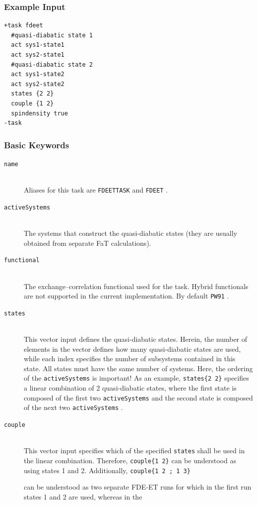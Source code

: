 \documentclass[bibliography=totocnumbered,a4paper,10pt,oneside]{scrbook}
\newcommand{\ttt}[1]{%
  \begingroup\setlength{\fboxsep}{1pt}%
  \colorbox{serenity-green!30}{\texttt{\hspace*{2pt}\vphantom{(g}#1\hspace*{2pt}}}%
  \endgroup
}
\begin{document}
\subsubsection{Example Input}
\begin{lstlisting}
+task fdeet
  #quasi-diabatic state 1
  act sys1-state1
  act sys2-state1
  #quasi-diabatic state 2
  act sys1-state2
  act sys2-state2
  states {2 2}
  couple {1 2}
  spindensity true
-task
\end{lstlisting}

\subsubsection{Basic Keywords}
\begin{description}
  \item [\texttt{name}]\hfill \\
  Aliases for this task are \ttt{FDEETTASK} and \ttt{FDEET}.
  \item [\texttt{activeSystems}]\hfill \\
  The systems that construct the quasi-diabatic states (they are usually obtained from separate FaT calculations).
  \item [\texttt{functional}]\hfill \\
  The exchange--correlation functional used for the task. Hybrid functionals are not supported in the current implementation.
  By default \ttt{PW91}.
  \item [\texttt{states}]\hfill \\
  This vector input defines the quasi-diabatic states. Herein, the number of elements in the vector defines how many
  quasi-diabatic states are used, while each index specifies the number of subsystems contained in this state. All states must have the same number 
  of systems. Here, the ordering of the \ttt{activeSystems} is important! As an example, \ttt{states\{2 2\}} specifies a linear combination of 2 quasi-diabatic states, where the first state is composed of the first two \ttt{activeSystems} and the second state is composed of the next two \ttt{activeSystems}.
  \item [\texttt{couple}]\hfill \\
  This vector input specifies which of the specified \ttt{states} shall be used in the linear combination.
  Therefore, \ttt{couple\{1 2\}} can be understood as using states 1 and 2. Additionally, \ttt{couple\{1 2 ; 1 3\}}
  can be understood as two separate FDE-ET runs for which in the first run states 1 and 2 are used, whereas in the

\end{description}
\end{document}

